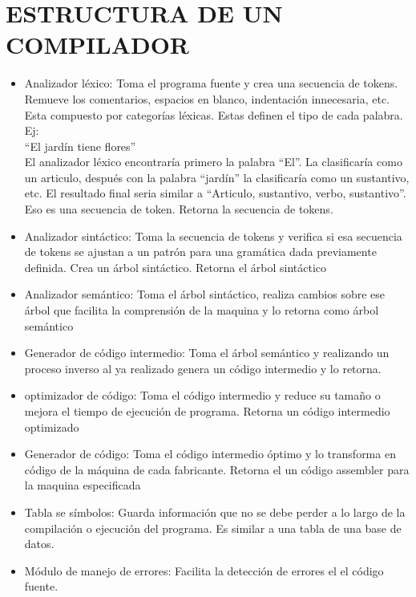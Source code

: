 \section{ESTRUCTURA DE UN COMPILADOR}

\begin{itemize}
    \item Analizador léxico: Toma el programa fuente y crea una secuencia de tokens. Remueve los comentarios, espacios en blanco, indentación innecesaria, etc. Esta compuesto por categorías léxicas. Estas definen el tipo de cada palabra. Ej: \\
    ``El jardín tiene flores''\\
    El analizador léxico encontraría primero la palabra ``El''. La clasificaría como un articulo, después con la palabra ``jardín'' la clasificaría como un sustantivo, etc. El resultado final seria similar a ``Articulo, sustantivo, verbo, sustantivo''. Eso es una secuencia de token. Retorna la secuencia de tokens.
    \item Analizador sintáctico: Toma la secuencia de tokens y verifica si esa secuencia de tokens se ajustan a un patrón para una gramática dada previamente definida. Crea un árbol sintáctico. Retorna el árbol sintáctico
    \item Analizador semántico: Toma el árbol sintáctico, realiza cambios sobre ese árbol que facilita la comprensión de la maquina y lo retorna como árbol semántico
    \item Generador de código intermedio: Toma el árbol semántico y realizando un proceso inverso al ya realizado genera un código intermedio y lo retorna.
    \item optimizador de código: Toma el código intermedio y reduce su tamaño o mejora el tiempo de ejecución de programa. Retorna un código intermedio optimizado
    \item Generador de código: Toma el código intermedio óptimo y lo transforma en código de la máquina de cada fabricante. Retorna el un código assembler para la maquina especificada
    \item Tabla se símbolos: Guarda información que no se debe perder a lo largo de la compilación o ejecución del programa. Es similar a una tabla de una base de datos.
    \item Módulo de manejo de errores: Facilita la detección de errores el el código fuente.
\end{itemize}


